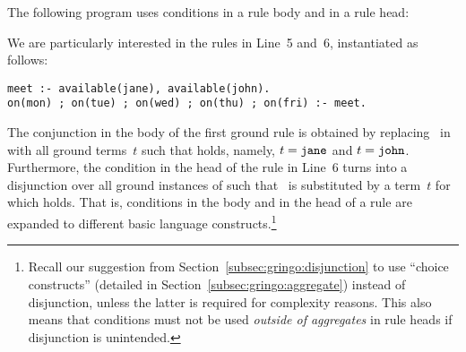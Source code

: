 \begin{example}\label{ex:cond}
The following program uses conditions in a rule body and in a rule head:
%

%
We are particularly interested in the rules in Line~5 and~6,
instantiated as follows:%
\begin{lstlisting}[numbers=none]
meet :- available(jane), available(john).
on(mon) ; on(tue) ; on(wed) ; on(thu) ; on(fri) :- meet.
\end{lstlisting}
%
The conjunction in the body of the first ground rule is obtained by replacing~ in
 with all ground terms~$t$ such that
 holds, namely, $t=\texttt{jane}$ and $t=\texttt{john}$.
Furthermore, the condition in the head of the rule in Line~6 turns into
a disjunction over all ground instances of
 such that~ is substituted by a term~$t$
for which
 holds.
That is, conditions in the body and in the head of a rule
are expanded to different basic language constructs.\footnote{%
Recall our suggestion from Section~\ref{subsec:gringo:disjunction}
to use ``choice constructs'' (detailed in Section~\ref{subsec:gringo:aggregate})
instead of disjunction, unless the latter is required for complexity reasons.
This also means that conditions must 
not be used \emph{outside of aggregates} in rule heads
if disjunction is unintended.}


\end{example}

